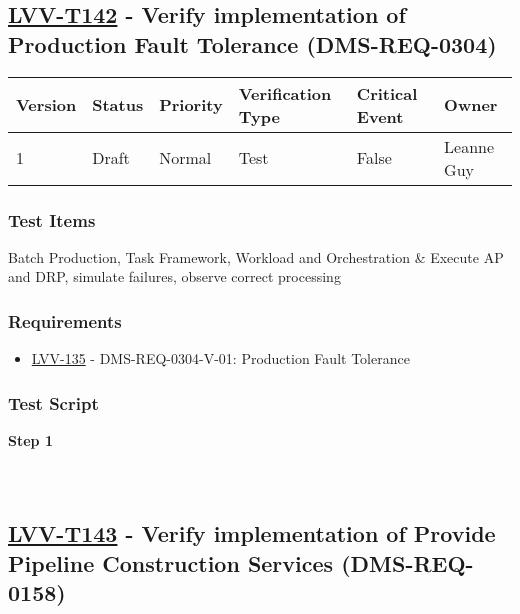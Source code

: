 \hypertarget{lvv-t142---verify-implementation-of-production-fault-tolerance-dms-req-0304}{%
\subsection{\texorpdfstring{\href{https://jira.lsstcorp.org/secure/Tests.jspa\#/testCase/LVV-T142}{LVV-T142}
- Verify implementation of Production Fault Tolerance
(DMS-REQ-0304)}{LVV-T142 - Verify implementation of Production Fault Tolerance (DMS-REQ-0304)}}\label{lvv-t142---verify-implementation-of-production-fault-tolerance-dms-req-0304}}

\begin{longtable}[]{@{}llllll@{}}
\toprule
Version & Status & Priority & Verification Type & Critical Event &
Owner\tabularnewline
\midrule
\endhead
1 & Draft & Normal & Test & False & Leanne Guy\tabularnewline
\bottomrule
\end{longtable}

\hypertarget{test-items-42}{%
\subsubsection{Test Items}\label{test-items-42}}

Batch Production, Task Framework, Workload and Orchestration \& Execute
AP and DRP, simulate failures, observe correct processing

\hypertarget{requirements-42}{%
\subsubsection{Requirements}\label{requirements-42}}

\begin{itemize}
\tightlist
\item
  \href{https://jira.lsstcorp.org/browse/LVV-135}{LVV-135} -
  DMS-REQ-0304-V-01: Production Fault Tolerance
\end{itemize}

\hypertarget{test-script-42}{%
\subsubsection{Test Script}\label{test-script-42}}

\textbf{Step 1}\\
~\\
~\\

\hypertarget{lvv-t143---verify-implementation-of-provide-pipeline-construction-services-dms-req-0158}{%
\subsection{\texorpdfstring{\href{https://jira.lsstcorp.org/secure/Tests.jspa\#/testCase/LVV-T143}{LVV-T143}
- Verify implementation of Provide Pipeline Construction Services
(DMS-REQ-0158)}{LVV-T143 - Verify implementation of Provide Pipeline Construction Services (DMS-REQ-0158)}}\label{lvv-t143---verify-implementation-of-provide-pipeline-construction-services-dms-req-0158}}

